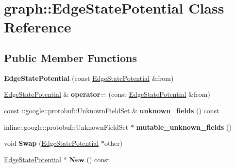 \hypertarget{classgraph_1_1EdgeStatePotential}{
\section{graph::EdgeStatePotential Class Reference}
\label{classgraph_1_1EdgeStatePotential}
}
\subsection*{Public Member Functions}
\begin{DoxyCompactItemize}
\item 
\hypertarget{classgraph_1_1EdgeStatePotential_a07c6b74b96e49c9dd58dd6801d331734}{
{\bfseries EdgeStatePotential} (const \hyperlink{classgraph_1_1EdgeStatePotential}{EdgeStatePotential} \&from)}
\label{classgraph_1_1EdgeStatePotential_a07c6b74b96e49c9dd58dd6801d331734}

\item 
\hypertarget{classgraph_1_1EdgeStatePotential_aa84be9ac7930900ea711dd50c61a992c}{
\hyperlink{classgraph_1_1EdgeStatePotential}{EdgeStatePotential} \& {\bfseries operator=} (const \hyperlink{classgraph_1_1EdgeStatePotential}{EdgeStatePotential} \&from)}
\label{classgraph_1_1EdgeStatePotential_aa84be9ac7930900ea711dd50c61a992c}

\item 
\hypertarget{classgraph_1_1EdgeStatePotential_aa3d87d59c31b9583a2723bf7d838b7e8}{
const ::google::protobuf::UnknownFieldSet \& {\bfseries unknown\_\-fields} () const }
\label{classgraph_1_1EdgeStatePotential_aa3d87d59c31b9583a2723bf7d838b7e8}

\item 
\hypertarget{classgraph_1_1EdgeStatePotential_ade01e66023e544434ec77933186df507}{
inline::google::protobuf::UnknownFieldSet $\ast$ {\bfseries mutable\_\-unknown\_\-fields} ()}
\label{classgraph_1_1EdgeStatePotential_ade01e66023e544434ec77933186df507}

\item 
\hypertarget{classgraph_1_1EdgeStatePotential_ae27775781654c45f108db1186e4702a7}{
void {\bfseries Swap} (\hyperlink{classgraph_1_1EdgeStatePotential}{EdgeStatePotential} $\ast$other)}
\label{classgraph_1_1EdgeStatePotential_ae27775781654c45f108db1186e4702a7}

\item 
\hypertarget{classgraph_1_1EdgeStatePotential_abcc4686ae346371daef72453939d9897}{
\hyperlink{classgraph_1_1EdgeStatePotential}{EdgeStatePotential} $\ast$ {\bfseries New} () const }
\label{classgraph_1_1EdgeStatePotential_abcc4686ae346371daef72453939d9897}


\end{DoxyCompactItemize}
